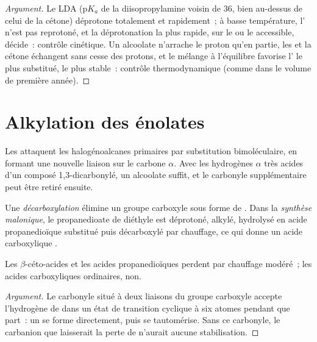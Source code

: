 \begin{proof}[Argument]
Le LDA ($\mathrm pK_a$ de la diisopropylamine voisin de 36, bien au-dessus de celui de la cétone)
déprotone totalement et rapidement~; à basse température, l' n'est pas reprotoné, et la
déprotonation la plus rapide, sur le  ou le  accessible, décide~: contrôle
cinétique. Un alcoolate n'arrache le proton qu'en partie, les  et la cétone échangent sans
cesse des protons, et le mélange à l'équilibre favorise l' le plus substitué, le plus
stable~: contrôle thermodynamique (comme dans le volume de première année).
\end{proof}

\section{Alkylation des énolates}

Les  attaquent les halogénoalcanes primaires par substitution bimoléculaire, en formant une
nouvelle liaison  sur le carbone $\alpha$. Avec les hydrogènes $\alpha$ très acides d'un composé
1,3-dicarbonylé, un alcoolate suffit, et le carbonyle supplémentaire peut être retiré ensuite.

\begin{definition}[Décarboxylation]\label{def:b2:enolates-aldol:decarboxylation}
Une \emph{décarboxylation} élimine un groupe carboxyle sous
forme de . Dans la \emph{synthèse malonique}, le
propanedioate de diéthyle est déprotoné, alkylé, hydrolysé en acide propanedioïque substitué puis
décarboxylé par chauffage, ce qui donne un acide carboxylique .
\end{definition}

\begin{proposition}\label{prop:b2:enolates-aldol:decarboxylation}
Les $\beta$-céto-acides et les acides propanedioïques perdent  par chauffage modéré~; les
acides carboxyliques ordinaires, non.
\end{proposition}

\begin{proof}[Argument]
Le carbonyle situé à deux liaisons du groupe carboxyle accepte l'hydrogène de  dans un état
de transition cyclique à six atomes pendant que  part~: un  se forme directement, puis
se tautomérise. Sans ce carbonyle, le carbanion que laisserait la perte de  n'aurait aucune
stabilisation.
\end{proof}

